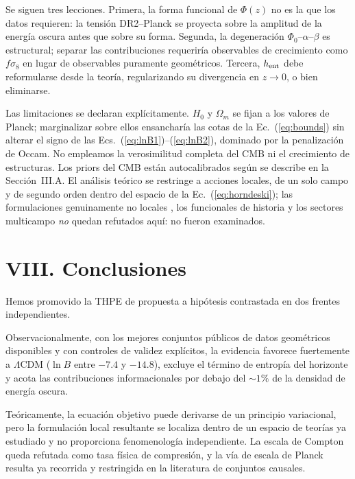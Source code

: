 \documentclass[aps,prd,twocolumn,superscriptaddress,nofootinbib,floatfix]{revtex4-2}
\newcommand{\LCDM}{\ensuremath{\Lambda}CDM}
\begin{document}
Se siguen tres lecciones. Primera, la forma funcional de $\Phi(z)$ no es
la que los datos requieren: la tensi\'on DR2--Planck se proyecta sobre
la amplitud de la energ\'ia oscura antes que sobre su forma. Segunda, la
degeneraci\'on $\Phi_0$--$\alpha$--$\beta$ es estructural; separar las
contribuciones requerir\'ia observables de crecimiento como $f\sigma_8$
en lugar de observables puramente geom\'etricos. Tercera,
$h_{\rm ent}$ debe reformularse desde la teor\'ia, regularizando su
divergencia en $z\to0$, o bien eliminarse.

Las limitaciones se declaran expl\'icitamente. $H_0$ y $\Omega_m$ se
fijan a los valores de Planck; marginalizar sobre ellos ensanchar\'ia
las cotas de la Ec.~(\ref{eq:bounds}) sin alterar el signo de las
Ecs.~(\ref{eq:lnB1})--(\ref{eq:lnB2}), dominado por la penalizaci\'on de
Occam. No empleamos la verosimilitud completa del CMB ni el crecimiento
de estructuras. Los priors del CMB est\'an autocalibrados seg\'un se
describe en la Secci\'on~III.A. El an\'alisis te\'orico se restringe a
acciones locales, de un solo campo y de segundo orden dentro del
espacio de la Ec.~(\ref{eq:horndeski}); las formulaciones genuinamente
no locales \cite{Deser2007}, los funcionales de historia y los sectores
multicampo \emph{no} quedan refutados aqu\'i: no fueron examinados.

\section*{VIII. Conclusiones}

Hemos promovido la THPE de propuesta a hip\'otesis contrastada en dos
frentes independientes.

Observacionalmente, con los mejores conjuntos p\'ublicos de datos
geom\'etricos disponibles y con controles de validez expl\'icitos, la
evidencia favorece fuertemente a \LCDM{} ($\ln B$ entre $-7.4$ y
$-14.8$), excluye el t\'ermino de entrop\'ia del horizonte y acota las
contribuciones informacionales por debajo del $\sim1\%$ de la densidad
de energ\'ia oscura.

Te\'oricamente, la ecuaci\'on objetivo puede derivarse de un principio
variacional, pero la formulaci\'on local resultante se localiza dentro
de un espacio de teor\'ias ya estudiado y no proporciona fenomenolog\'ia
independiente. La escala de Compton queda refutada como tasa f\'isica de
compresi\'on, y la v\'ia de escala de Planck resulta ya recorrida y
restringida en la literatura de conjuntos causales.
\end{document}
